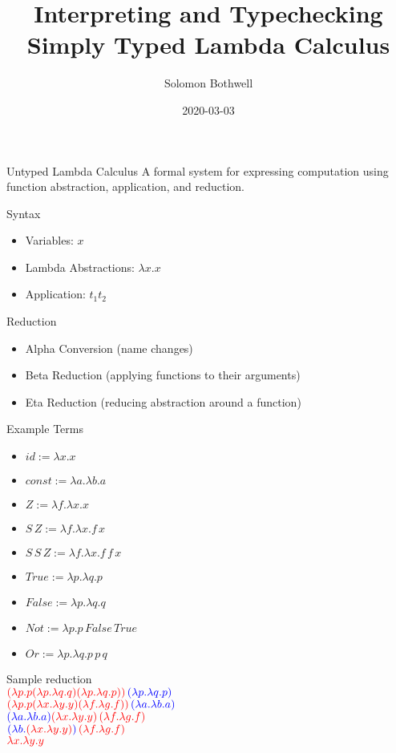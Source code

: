 \documentclass[presentation]{beamer}
\author{Solomon Bothwell}
\date{2020-03-03}
\title{Interpreting and Typechecking Simply Typed Lambda Calculus}
\begin{document}
\maketitle

\begin{frame}[label={sec:orgefc96a0}]{Untyped Lambda Calculus}
A formal system for expressing computation using function abstraction,
application, and reduction.
\end{frame}
\begin{frame}[label={sec:org0a8d6db}]{Syntax}
\begin{itemize}
\item Variables: \(x\)
\item Lambda Abstractions: \(\lambda x.x\)
\item Application: \(t_1 t_2\)
\end{itemize}
\end{frame}
\begin{frame}[label={sec:org342c828}]{Reduction}
\begin{itemize}
\item Alpha Conversion (name changes)
\item Beta Reduction (applying functions to their arguments)
\item Eta Reduction (reducing abstraction around a function)
\end{itemize}
\end{frame}
\begin{frame}[label={sec:org262becf}]{Example Terms}
\begin{itemize}
\item \(id := \lambda x.x\)
\item \(const := \lambda a.\lambda b.a\)
\item \(Z := \lambda f.\lambda x.x\)
\item \(S\,Z := \lambda f.\lambda x.f\,x\)
\item \(S\,S\,Z := \lambda f.\lambda x.f\,f\,x\)
\item \(True := \lambda p.\lambda q.p\)
\item \(False := \lambda p.\lambda q.q\)
\item \(Not := \lambda p.p\,False\,True\)
\item \(Or := \lambda p.\lambda q.p\,p\,q\)
\end{itemize}
\end{frame}
\begin{frame}[label={sec:orgc1524cd}]{Sample reduction}
 \\
\(\color{red}(\lambda p.p (\lambda p.\lambda q.q) (\lambda p.\lambda q.p))\,\color{blue}(\lambda p.\lambda q.p)\) \\
\(\color{red}(\lambda p.p (\lambda x.\lambda y.y) (\lambda f.\lambda g.f))\,\color{blue}(\lambda a.\lambda b.a)\) \\
\(\color{blue}(\lambda a.\lambda b.a) \color{red}(\lambda x.\lambda y.y)\,(\lambda f.\lambda g.f)\) \\
\(\color{blue}(\lambda b.\color{red}(\lambda x.\lambda y.y)\color{blue})\,\color{red}(\lambda f.\lambda g.f)\) \\
\(\color{red}\lambda x.\lambda y.y\)
\end{frame}
\end{document}
